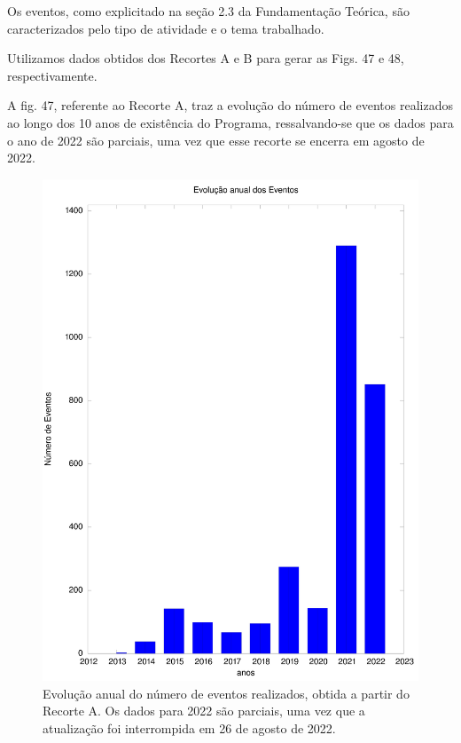 Os eventos, como explicitado na seção 2.3 da Fundamentação Teórica, são caracterizados pelo tipo de atividade e o tema trabalhado.

Utilizamos dados obtidos dos Recortes A e B para gerar as Figs. 47 e 48, respectivamente.

A fig. 47, referente ao Recorte A, traz a evolução do número de eventos realizados ao longo dos 10 anos de existência do Programa, ressalvando-se que os dados para o ano de 2022 são parciais, uma vez que esse recorte se encerra em agosto de 2022.



\captionsetup{format=plain}
\begin{figure}[p]

\centering


\begin{minipage}[b]{0.4\linewidth}
        \centering
                \includegraphics[width=1.0\linewidth]{../../../imagens/output-eventos.jpeg}
                \caption{Evolução anual do número de eventos realizados, obtida a partir do Recorte A. Os dados para 2022 são parciais, uma vez que a atualização foi interrompida em 26 de agosto de 2022.}
                \label{8af5236ba8f91623157f8f95ae10366b416d6049}
\end{minipage}%
\hspace{0.5cm}
\end{figure}



